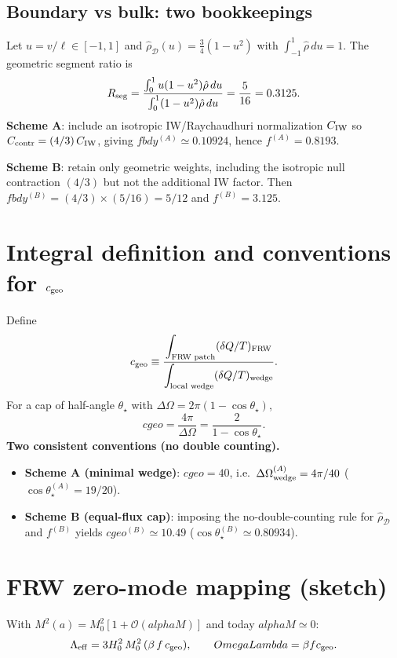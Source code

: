 \documentclass[aps,prd,onecolumn,superscriptaddress,nofootinbib]{revtex4-2}
\def\OmL{OmegaLambda}%
\def\cgeo{cgeo}%
\def\alphaM{alphaM}%
\def\fbdy{fbdy}%
\def\boxed#1{#1}%
\newcommand{\OmL}{\Omega_\Lambda}
\newcommand{\cgeo}{c_{\rm geo}}
\newcommand{\alphaM}{\alpha_M}
\newcommand{\fbdy}{f_{\rm bdy}}
\begin{document}
\subsection{Boundary vs bulk: two bookkeepings}
\label{app:fbdy-derivation}
Let $u=v/\ell\in[-1,1]$ and $\hat\rho_{\mathcal D}(u)=\tfrac{3}{4}(1-u^2)$ with $\int_{-1}^1\hat\rho\,du=1$.
The geometric segment ratio is
\[
R_{\rm seg}=
\frac{\int_{0}^{1} u(1-u^2)\hat\rho\,du}{\int_{0}^{1} (1-u^2)\hat\rho\,du}
=\frac{5}{16}=0.3125.
\]
\textbf{Scheme A}: include an isotropic IW/Raychaudhuri normalization $C_{\rm IW}$ so $C_{\rm contr}=({4}/{3})\,C_{\rm IW}$, giving $\fbdy^{(A)}\simeq0.10924$, hence $f^{(A)}=0.8193$.

\textbf{Scheme B}: retain only geometric weights, including the isotropic null contraction $(4/3)$ but not the additional IW factor. Then $\fbdy^{(B)}=(4/3)\times (5/16)=5/12$ and $f^{(B)}=3.125$.

\section{Integral definition and conventions for \texorpdfstring{$c_{\rm geo}$}{cgeo}}
\label{app:cgeo-integral}
Define
\begin{equation}
c_{\rm geo} \equiv \frac{\displaystyle \int_{\text{FRW patch}} (\delta Q/T)_{\text{FRW}}}{\displaystyle \int_{\text{local wedge}} (\delta Q/T)_{\text{wedge}}}.
\label{eq:cgeo-def}
\end{equation}
For a cap of half-angle $\theta_\star$ with $\Delta\Omega=2\pi(1-\cos\theta_\star)$,
\begin{equation}
\cgeo = \frac{4\pi}{\Delta\Omega} = \frac{2}{1-\cos\theta_\star}.
\end{equation}
\textbf{Two consistent conventions (no double counting).}
\begin{itemize}[leftmargin=1.3em]
\item \textbf{Scheme A (minimal wedge)}: $\boxed{\cgeo=40}$, i.e.\ $\Delta\Omega_{\rm wedge}^{(A)}=4\pi/40$ ($\cos\theta_\star^{(A)}=19/20$).
\item \textbf{Scheme B (equal-flux cap)}: imposing the no-double-counting rule for $\hat\rho_{\mathcal D}$ and $f^{(B)}$ yields $\boxed{\cgeo^{(B)} \simeq 10.49}$ ($\cos\theta_\star^{(B)}\simeq 0.80934$).
\end{itemize}

\section{FRW zero-mode mapping (sketch)}
\label{app:frw-mapping}
With $M^2(a)=M_0^2[1+\mathcal O(\alphaM)]$ and today $\alphaM\simeq 0$:
\begin{equation}
\Lambda_{\rm eff} = 3 H_0^2 \,M_0^2 \,(\beta\, f\, c_{\rm geo}),\qquad
\OmL=\beta f c_{\rm geo}.
\end{equation}
\end{document}
